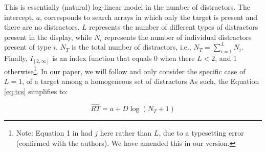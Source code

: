 \documentclass[preprint,12pt,authoryear]{elsarticle}
\begin{document}
This is essentially (natural) log-linear model in the number of distractors. The intercept, $a$, corresponds to search arrays in which only the target is present and there are no distractors. $L$ represents the number of different types of distractors present in the display, while $N_i$ represents the number of individual distractors present of type $i$. $N_T$ is the total number of distractors, i.e., $N_T = \sum_{i=1}^{L}N_i$. Finally, $I_{[2, \infty]}$ is an index function that equals 0 when there $L<2$, and 1 otherwise\footnote{Note: Equation 1 in \cite{lleras2020target} had $j$ here rather than $L$, due to a typesetting error (confirmed with the authors). We have amended this in our version.}. In our paper, we will follow \cite{buetti2019predicting} and only consider the specific case of $L=1$, of a target among a homogeneous set of distractors  As such, the Equation \ref{eq:tcs} simplifies to:

\begin{equation}
\hat{RT} = a + D\log(N_T+1)
\label{eq:loglin}
\end{equation}
\end{document}
